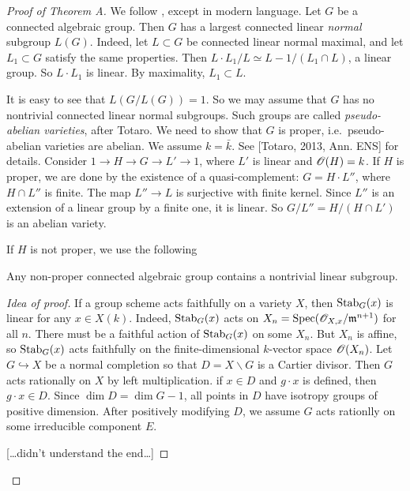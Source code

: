 \begin{proof}[Proof of Theorem A]
We follow \cite{r56}, except in modern language. Let $G$ be a connected 
algebraic group. Then $G$ has a largest connected linear \emph{normal} subgroup 
$L(G)$. Indeed, let $L\subset G$ be connected linear normal maximal, and let 
$L_1\subset G$ satisfy the same properties. Then 
$L\cdot L_1 /L\simeq L-1/(L_1\cap L)$, a linear group. So $L\cdot L_1$ is linear. 
By maximality, $L_1\subset L$. 

It is easy to see that $L(G/L(G))=1$. So we may assume that $G$ has no 
nontrivial connected linear normal subgroups. Such groups are called 
\emph{pseudo-abelian varieties}, after Totaro. We need to show that 
$G$ is proper, i.e.\ pseudo-abelian varieties are abelian. We assume $k=\bar k$. 
See [Totaro, 2013, Ann. ENS] for details. Consider 
$1 \to H \to G \to L' \to 1$, where $L'$ is linear and $\mathscr{O}(H)=k$. If $H$ is 
proper, we are done by the existence of a quasi-complement: 
$G=H\cdot L''$, where $H\cap L''$ is finite. The map $L'' \to L$ is surjective 
with finite kernel. Since $L''$ is an extension of a linear group by a finite 
one, it is linear. So $G/L''=H/(H\cap L')$ is an abelian variety. 

If $H$ is not proper, we use the following 

\begin{lemm}[Rosenlicht]
Any non-proper connected algebraic group contains a nontrivial linear subgroup. 
\end{lemm}
\begin{proof}[Idea of proof]
If a group scheme acts faithfully on a variety $X$, then 
$\operatorname{Stab}_G(x)$ is linear for any $x\in X(k)$. Indeed, $\operatorname{Stab}_G(x)$ 
acts on $X_n=\operatorname{Spec}(\mathscr{O}_{X,x}/\mathfrak{m}^{n+1})$ for all $n$. There must be a 
faithful action of $\operatorname{Stab}_G(x)$ on some $X_n$. But $X_n$ is affine, 
so $\operatorname{Stab}_G(x)$ acts faithfully on the finite-dimensional $k$-vector 
space $\mathscr{O}(X_n)$. Let $G\hookrightarrow X$ be a normal completion so that 
$D=X\smallsetminus G$ is a Cartier divisor. Then $G$ acts rationally on 
$X$ by left multiplication. if $x\in D$ and 
$g\cdot x$ is defined, then $g\cdot x\in D$. Since 
$\dim D=\dim G-1$, all points in $D$ have  
isotropy groups of positive dimension. After positively modifying $D$, we 
assume $G$ acts rationlly on some irreducible component $E$. 

[\ldots didn't understand the end\ldots]
\end{proof}
\end{proof}

